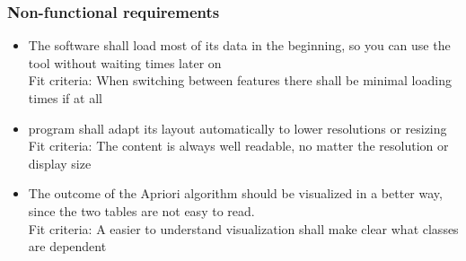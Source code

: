 \subsubsection{Non-functional requirements}
\begin{itemize}
\item The software shall load most of its data in the beginning, so you can use the tool without waiting times later on\\
Fit criteria: When switching between features there shall be minimal loading times if at all



\item program shall adapt its layout automatically to lower resolutions or resizing\\
Fit criteria: The content is always well readable, no matter the resolution or display size
\item The outcome of the Apriori algorithm should be visualized in a better way, since the two tables are not easy to read.\\
Fit criteria: A easier to understand visualization shall make clear what classes are dependent
\end{itemize}